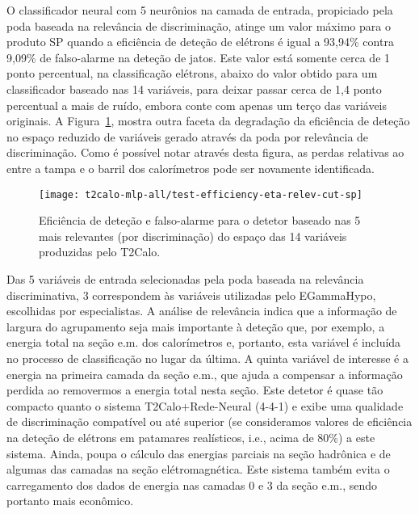 O classificador neural com 5 neurônios na camada de entrada, propiciado pela
poda baseada na relevância de discriminação, atinge um valor máximo para o
produto SP quando a eficiência de deteção de elétrons é igual a 93,94\% contra
9,09\% de falso-alarme na deteção de jatos. Este valor está somente cerca de 1
ponto percentual, na classificação elétrons, abaixo do valor obtido para um
classificador baseado nas 14 variáveis, para deixar passar cerca de 1,4 ponto
percentual a mais de ruído, embora conte com apenas um terço das variáveis
originais. A Figura~\ref{fig:t2calo-mlp-all-test-efficiency-eta-relev-cut-sp},
mostra outra faceta da degradação da eficiência de deteção no espaço reduzido
de variáveis gerado através da poda por relevância de discriminação. Como é
possível notar através desta figura, as perdas relativas ao  entre
a tampa e o barril dos calorímetros pode ser novamente identificada.

\begin{figure}
\begin{center}
\texttt{[image: t2calo-mlp-all/test-efficiency-eta-relev-cut-sp]}
\end{center}
\caption{Eficiência de deteção e falso-alarme para o detetor baseado nas 5
mais relevantes (por discriminação) do espaço das 14 variáveis produzidas pelo
T2Calo.}
\label{fig:t2calo-mlp-all-test-efficiency-eta-relev-cut-sp}
\end{figure}

Das 5 variáveis de entrada selecionadas pela poda baseada na relevância
discriminativa, 3 correspondem às variáveis utilizadas pelo EGammaHypo,
escolhidas por especialistas. A análise de relevância indica que a informação
de largura do agrupamento seja mais importante à deteção que, por exemplo, a
energia total na seção e.m. dos calorímetros e, portanto, esta variável é
incluída no processo de classificação no lugar da última. A quinta variável de
interesse é a energia na primeira camada da seção e.m., que ajuda a compensar
a informação perdida ao removermos a energia total nesta seção. Este detetor é
quase tão compacto quanto o sistema T2Calo+Rede-Neural (4-4-1) e exibe uma
qualidade de discriminação compatível ou até superior (se consideramos valores
de eficiência na deteção de elétrons em patamares realísticos, i.e., acima de
80\%) a este sistema. Ainda, poupa o cálculo das energias parciais na seção
hadrônica e de algumas das camadas na seção elétromagnética. Este sistema
também evita o carregamento dos dados de energia nas camadas 0 e 3 da seção
e.m., sendo portanto mais econômico.

